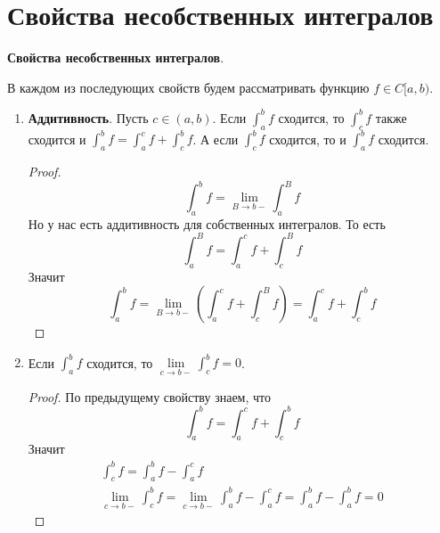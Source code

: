 \section{Свойства несобственных интегралов}
\textbf{Свойства несобственных интегралов}.

В каждом из последующих свойств будем рассматривать функцию $f \in C[a, b)$.

\begin{enumerate}
  \item \textbf{Аддитивность}. Пусть $c \in (a, b)$. Если $\int_{a}^{b} f$ сходится, то $\int_{c}^{b} f$ также сходится и $\int_{a}^{b} f = \int_{a}^{c} f + \int_{c}^{b} f$. А если $\int_{c}^{b} f$ сходится, то и $\int_{a}^{b} f$ сходится.
  \begin{proof}
    \begin{equation*}
      \int_{a}^{b} f = \lim\limits_{B \to b-} \int_{a}^{B} f
    \end{equation*}
    Но у нас есть аддитивность для собственных интегралов. То есть
    \begin{equation*}
      \int_{a}^{B} f = \int_{a}^{c} f + \int_{c}^{B} f
    \end{equation*}
    Значит
    \begin{equation*}
      \int_{a}^{b} f = \lim\limits_{B \to b-} \left( \int_{a}^{c} f + \int_{c}^{B} f \right) =
      \int_{a}^{c} f + \int_{c}^{b} f
    \end{equation*}
  \end{proof}

  \item Если $\int_{a}^{b} f$ сходится, то $\lim\limits_{c \to b-} \int_{c}^{b} f = 0$.
  \begin{proof}
    По предыдущему свойству знаем, что
    \begin{equation*}
      \int_{a}^{b} f = \int_{a}^{c} f + \int_{c}^{b} f
    \end{equation*}
    Значит
    \begin{equation*}
      \begin{gathered}
        \int_{c}^{b} f = \int_{a}^{b} f - \int_{a}^{c} f \\
        \lim\limits_{c \to b-} \int_{c}^{b} f = \lim\limits_{c \to b-} \int_{a}^{b} f - \int_{a}^{c} f = \int_{a}^{b} f - \int_{a}^{b} f = 0
      \end{gathered}
    \end{equation*}
  \end{proof}


\end{enumerate}
